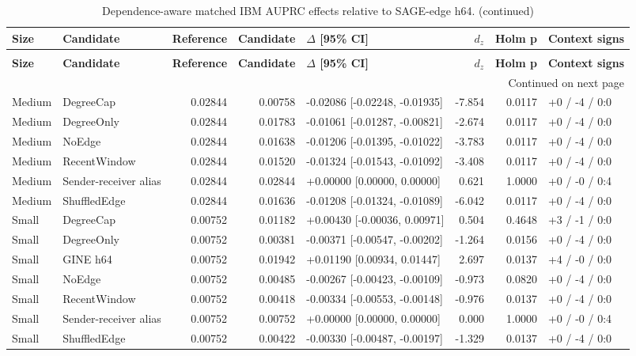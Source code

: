 \begingroup
\footnotesize
\setlength{\tabcolsep}{3pt}
\renewcommand{\arraystretch}{1.10}
\begin{longtable}{@{}p{} p{} r r p{} r r p{}@{}}
\caption{Dependence-aware matched IBM AUPRC effects relative to SAGE-edge h64.}\label{tab:s-ibm-effect-auprc}\\
\toprule
\textbf{Size} & \textbf{Candidate} & \textbf{Reference} & \textbf{Candidate} & \textbf{$\Delta$ [95\% CI]} & \textbf{$d_z$} & \textbf{Holm p} & \textbf{Context signs} \\
\midrule
\endfirsthead
\caption[]{Dependence-aware matched IBM AUPRC effects relative to SAGE-edge h64. (continued)}\\
\toprule
\textbf{Size} & \textbf{Candidate} & \textbf{Reference} & \textbf{Candidate} & \textbf{$\Delta$ [95\% CI]} & \textbf{$d_z$} & \textbf{Holm p} & \textbf{Context signs} \\
\midrule
\endhead
\midrule
\multicolumn{8}{r}{\footnotesize Continued on next page}\\
\endfoot
\bottomrule
\endlastfoot
Medium & DegreeCap & 0.02844 & 0.00758 & -0.02086 [-0.02248, -0.01935] & -7.854 & 0.0117 & +0 / -4 / 0:0 \\
Medium & DegreeOnly & 0.02844 & 0.01783 & -0.01061 [-0.01287, -0.00821] & -2.674 & 0.0117 & +0 / -4 / 0:0 \\
Medium & NoEdge & 0.02844 & 0.01638 & -0.01206 [-0.01395, -0.01022] & -3.783 & 0.0117 & +0 / -4 / 0:0 \\
Medium & RecentWindow & 0.02844 & 0.01520 & -0.01324 [-0.01543, -0.01092] & -3.408 & 0.0117 & +0 / -4 / 0:0 \\
Medium & Sender-receiver alias & 0.02844 & 0.02844 & +0.00000 [0.00000, 0.00000] & 0.621 & 1.0000 & +0 / -0 / 0:4 \\
Medium & ShuffledEdge & 0.02844 & 0.01636 & -0.01208 [-0.01324, -0.01089] & -6.042 & 0.0117 & +0 / -4 / 0:0 \\
Small & DegreeCap & 0.00752 & 0.01182 & +0.00430 [-0.00036, 0.00971] & 0.504 & 0.4648 & +3 / -1 / 0:0 \\
Small & DegreeOnly & 0.00752 & 0.00381 & -0.00371 [-0.00547, -0.00202] & -1.264 & 0.0156 & +0 / -4 / 0:0 \\
Small & GINE h64 & 0.00752 & 0.01942 & +0.01190 [0.00934, 0.01447] & 2.697 & 0.0137 & +4 / -0 / 0:0 \\
Small & NoEdge & 0.00752 & 0.00485 & -0.00267 [-0.00423, -0.00109] & -0.973 & 0.0820 & +0 / -4 / 0:0 \\
Small & RecentWindow & 0.00752 & 0.00418 & -0.00334 [-0.00553, -0.00148] & -0.976 & 0.0137 & +0 / -4 / 0:0 \\
Small & Sender-receiver alias & 0.00752 & 0.00752 & +0.00000 [0.00000, 0.00000] & 0.000 & 1.0000 & +0 / -0 / 0:4 \\
Small & ShuffledEdge & 0.00752 & 0.00422 & -0.00330 [-0.00487, -0.00197] & -1.329 & 0.0137 & +0 / -4 / 0:0 \\
\end{longtable}
